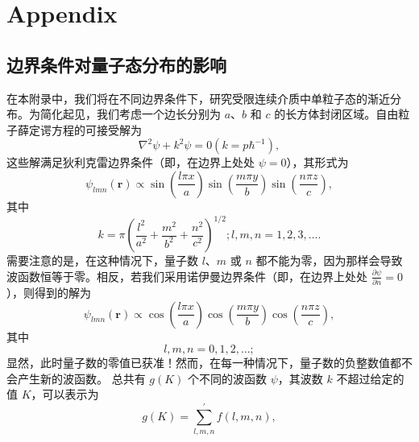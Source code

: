 ﻿\chapter*{Appendix} 

\section{边界条件对量子态分布的影响}\label{ux8fb9ux754cux6761ux4ef6ux5bf9ux91cfux5b50ux6001ux5206ux5e03ux7684ux5f71ux54cd}

在本附录中，我们将在不同边界条件下，研究受限连续介质中单粒子态的渐近分布。为简化起见，我们考虑一个边长分别为 \(a\)、\(b\) 和 \(c\) 的长方体封闭区域。自由粒子薛定谔方程的可接受解为
\begin{equation}\tag{17.1.1}\label{eq:17.1.1}
\nabla ^{2} \psi + k ^{2} \psi = 0  \left( k = p \hbar ^{- 1} \right) ,
\end{equation}
这些解满足狄利克雷边界条件（即，在边界上处处 \(\psi=0\)），其形式为
\begin{equation}\tag{17.1.2}\label{eq:17.1.2}
\psi _ { l m n } ( \pmb { r } ) \propto \sin \left( \frac { l \pi x } { a } \right) \sin \left( \frac { m \pi y } { b } \right) \sin \left( \frac { n \pi z } { c } \right) ,
\end{equation}
其中
\begin{equation}\tag{17.1.3}\label{eq:17.1.3}
k = \pi \left( \frac { l ^{2} } { a ^{2} } + \frac { m ^{2} } { b ^{2} } + \frac { n ^{2} } { c ^{2} } \right) ^{1 / 2} ;  l , m , n = 1 , 2 , 3 , \ldots .
\end{equation}
需要注意的是，在这种情况下，量子数 \(l\)、\(m\) 或 \(n\) 都不能为零，因为那样会导致波函数恒等于零。相反，若我们采用诺伊曼边界条件（即，在边界上处处 \(\frac{\partial\psi}{\partial n}=0\)），则得到的解为
\begin{equation}\tag{17.1.4}\label{eq:17.1.4}
\psi _ { l m n } ( \pmb { r } ) \propto \cos \left( \frac { l \pi x } { a } \right) \cos \left( \frac { m \pi y } { b } \right) \cos \left( \frac { n \pi z } { c } \right) ,
\end{equation}
其中
\begin{equation}\tag{17.1.5}\label{eq:17.1.5}
l , m , n = 0 , 1 , 2 , \ldots ;
\end{equation}
显然，此时量子数的零值已获准！然而，在每一种情况下，量子数的负整数值都不会产生新的波函数。
总共有 \(g(K)\) 个不同的波函数 \(\psi\)，其波数 \(k\) 不超过给定的值 \(K\)，可以表示为
\begin{equation}\tag{17.1.6}\label{eq:17.1.6}
g ( K ) = \sum _ { l , m , n } ^{\prime} f ( l , m , n ) ,
\end{equation}
